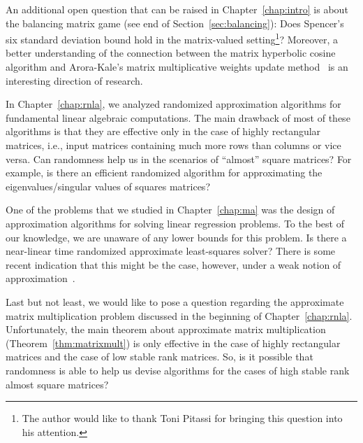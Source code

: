 %
An additional open question that can be raised in Chapter~\ref{chap:intro} is about the balancing matrix game (see end of Section~\ref{sec:balancing}): Does Spencer's six standard deviation bound hold in the matrix-valued setting\footnote{The author would like to thank Toni Pitassi for bringing this question into his attention.}? Moreover, a better understanding of the connection between the matrix hyperbolic cosine algorithm and Arora-Kale's matrix multiplicative weights update method~\cite{arora:fast_SDP,phdthesis:Kale:2008} is an interesting direction of research.
%

%
In Chapter~\ref{chap:rnla}, we analyzed randomized approximation algorithms for fundamental linear algebraic computations. The main drawback of most of these algorithms is that they are effective only in the case of highly rectangular matrices, i.e., input matrices containing much more rows than columns or vice versa. Can randomness help us in the scenarios of  ``almost'' square matrices? For example, is there an efficient randomized algorithm for approximating the eigenvalues/singular values of squares matrices?
%

%
One of the problems that we studied in Chapter~\ref{chap:ma} was the design of approximation algorithms for solving linear regression problems. To the best of our knowledge, we are unaware of any lower bounds for this problem. Is there a near-linear time randomized approximate least-squares solver? There is some recent indication that this might be the case, however, under a weak notion of approximation~\cite{ls:nnzA}.
%

%
Last but not least, we would like to pose a question regarding the approximate matrix multiplication problem discussed in the beginning of Chapter~\ref{chap:rnla}. Unfortunately, the main theorem about approximate matrix multiplication (Theorem~\ref{thm:matrixmult}) is only effective in the case of highly rectangular matrices and the case of low stable rank matrices. So, is it possible that randomness is able to help us devise algorithms for the cases of high stable rank almost square matrices?
%
%
